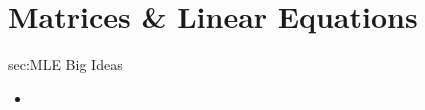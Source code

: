 \chapter{Matrices \& Linear Equations}
\label{chap:MLE}

\begin{bigideas}{sec:MLE Big Ideas}
\begin{itemize}
  \item 
\end{itemize}
\end{bigideas}
